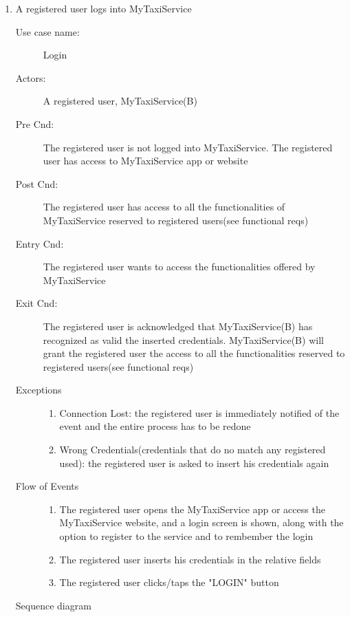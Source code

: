 \documentclass[11pt,titlepage]{article} %
\begin{document}
\begin{enumerate}
	        \item A registered user logs into MyTaxiService
		\begin{description}
		        \item [Use case name:] Login
		        \item [Actors:] A registered user, MyTaxiService(B)
		        \item [Pre Cnd:] The registered user is not logged into MyTaxiService. The registered
		        user has access to MyTaxiService app or website
		        \item [Post Cnd:] The registered user has access to all the functionalities of
		        MyTaxiService reserved to registered users(see functional reqs)
		        \item [Entry Cnd:] The registered user wants to access the functionalities offered by MyTaxiService
		        \item [Exit Cnd:]  The registered user is acknowledged that MyTaxiService(B) has recognized as valid the inserted
		        credentials. MyTaxiService(B) will grant the registered user the access to all the functionalities
		        reserved to registered users(see functional reqs)
		        \item [Exceptions]\hfill
			\begin{enumerate}
			          \item Connection Lost: the registered user is immediately notified of the event and the entire process
			          has to be redone
			          \item Wrong Credentials(credentials that do no match any registered used): the registered user is asked to insert his credentials again
			\end{enumerate}
		        \item [Flow of Events]\hfill
			\begin{enumerate}
			          \item The registered user opens the MyTaxiService app or access the MyTaxiService website, and a login
			          screen is shown, along with the option to register to the service and to rembember the login
			          \item The registered user inserts his credentials in the relative fields
			          \item The registered user clicks/taps the "LOGIN" button
			\end{enumerate}
		\end{description}
		Sequence diagram
		\begin{center}

\end{center}
\end{enumerate}
\end{document}
